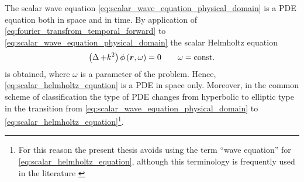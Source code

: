 The scalar wave equation \eqref{eq:scalar_wave_equation_physical_domain}
is a \ac{PDE} equation both in space and in time.
By application of \eqref{eq:fourier_transfrom_temporal_forward} to
\eqref{eq:scalar_wave_equation_physical_domain} the scalar Helmholtz equation
\begin{equation}\label{eq:scalar_helmholtz_equation}
	\left( \laplace + k^2 \right) \phi \left( \robs, \omega \right) = 0
	\qquad \omega = \mathrm{const.}
\end{equation}
is obtained, where $\omega$ is a parameter of the problem.
Hence, \eqref{eq:scalar_helmholtz_equation} is a \ac{PDE} in space only.
Moreover, in the common scheme of classification \cite[pp.~38]{Sommerfeld1964}
the type of \ac{PDE} changes from hyperbolic to elliptic type in the
transition from \eqref{eq:scalar_wave_equation_physical_domain} to
\eqref{eq:scalar_helmholtz_equation}\footnote{For this reason the present
thesis avoids using the term \enquote{wave equation} for
\eqref{eq:scalar_helmholtz_equation}, although this terminology is frequently
used in the literature \cite[p.~238]{Sommerfeld1964}\cite{Coifman1993}}.












